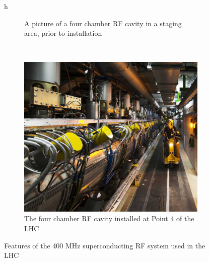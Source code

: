 \begin{figure}{h}
\begin{subfigure}[h]{0.450\textwidth}
        \caption{A picture of a four chamber RF cavity in a staging
          area, prior to installation}\label{fig:lhc_rf_staged}
      \end{subfigure}
      ~ %
      \begin{subfigure}[h]{0.450\textwidth}
        \includegraphics[width=\textwidth]{Figures/LHC_Diagrams/LHC_RFCavity_Installed.jpg}
        \caption{The four chamber RF cavity installed at Point 4 of
          the LHC}\label{fig:lhc_rf_at_p4}
      \end{subfigure}
      \caption{Features of the 400 MHz superconducting RF system used in the LHC}\label{fig:lhc_rf}
\end{figure}

